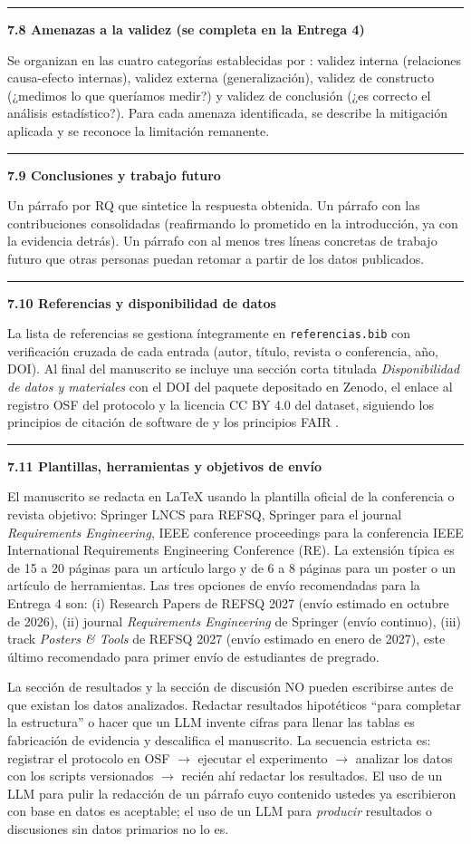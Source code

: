 \documentclass[11pt,a4paper]{article}
\newcounter{secc}
\newcommand{\submark}[1]{\par\vspace{4pt}\noindent
    {\color{uteqgreen}\rule[-1pt]{3.5pt}{12pt}}\hspace{6pt}\textbf{\color{uteqgreen}#1}\par\vspace{2pt}}
\begin{document}
\submark{7.8 Amenazas a la validez (se completa en la Entrega 4)}
Se organizan en las cuatro categorías establecidas por \cite{wohlin2012experimentation}: validez interna (relaciones causa-efecto internas), validez externa (generalización), validez de constructo (¿medimos lo que queríamos medir?) y validez de conclusión (¿es correcto el análisis estadístico?).
Para cada amenaza identificada, se describe la mitigación aplicada y se reconoce la limitación remanente.

\submark{7.9 Conclusiones y trabajo futuro}
Un párrafo por RQ que sintetice la respuesta obtenida.
Un párrafo con las contribuciones consolidadas (reafirmando lo prometido en la introducción, ya con la evidencia detrás).
Un párrafo con al menos tres líneas concretas de trabajo futuro que otras personas puedan retomar a partir de los datos publicados.

\submark{7.10 Referencias y disponibilidad de datos}
La lista de referencias se gestiona íntegramente en \texttt{referencias.bib} con verificación cruzada de cada entrada (autor, título, revista o conferencia, año, DOI).
Al final del manuscrito se incluye una sección corta titulada \emph{Disponibilidad de datos y materiales} con el DOI del paquete depositado en Zenodo, el enlace al registro OSF del protocolo y la licencia CC BY 4.0 del dataset, siguiendo los principios de citación de software de \cite{smith2016force11} y los principios FAIR \cite{wilkinson2016fair}.

\submark{7.11 Plantillas, herramientas y objetivos de envío}
El manuscrito se redacta en LaTeX usando la plantilla oficial de la conferencia o revista objetivo: Springer LNCS para REFSQ, Springer para el journal \textit{Requirements Engineering}, IEEE conference proceedings para la conferencia IEEE International Requirements Engineering Conference (RE).
La extensión típica es de 15 a 20 páginas para un artículo largo y de 6 a 8 páginas para un poster o un artículo de herramientas.
Las tres opciones de envío recomendadas para la Entrega 4 son: (i) Research Papers de REFSQ 2027 (envío estimado en octubre de 2026), (ii) journal \textit{Requirements Engineering} de Springer (envío continuo), (iii) track \emph{Posters \& Tools} de REFSQ 2027 (envío estimado en enero de 2027), este último recomendado para primer envío de estudiantes de pregrado.

\begin{alertbox}[title=Advertencia específica para la redacción del manuscrito]
La sección de resultados y la sección de discusión NO pueden escribirse antes de que existan los datos analizados. Redactar resultados hipotéticos ``para completar la estructura'' o hacer que un LLM invente cifras para llenar las tablas es fabricación de evidencia y descalifica el manuscrito. La secuencia estricta es: registrar el protocolo en OSF $\rightarrow$ ejecutar el experimento $\rightarrow$ analizar los datos con los scripts versionados $\rightarrow$ recién ahí redactar los resultados. El uso de un LLM para pulir la redacción de un párrafo cuyo contenido ustedes ya escribieron con base en datos es aceptable; el uso de un LLM para \emph{producir} resultados o discusiones sin datos primarios no lo es.
\end{alertbox}
\end{document}
